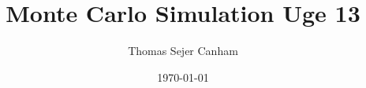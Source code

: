\documentclass{article}
\title{Monte Carlo Simulation Uge 13}
\author{Thomas Sejer Canham}
\date{\today}
\theoremstyle{definition}
\theoremstyle{remark}
\begin{document}

\begin{titlepage}

    \maketitle
    \thispagestyle{empty}

\end{titlepage}
\end{document}
